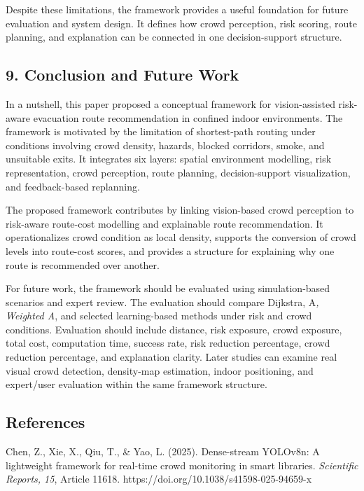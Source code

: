 \documentclass[
]{article}
\begin{document}
Despite these limitations, the framework provides a useful foundation
for future evaluation and system design. It defines how crowd
perception, risk scoring, route planning, and explanation can be
connected in one decision-support structure.

\subsection{9. Conclusion and Future
Work}\label{conclusion-and-future-work}

In a nutshell, this paper proposed a conceptual framework for
vision-assisted risk-aware evacuation route recommendation in confined
indoor environments. The framework is motivated by the limitation of
shortest-path routing under conditions involving crowd density, hazards,
blocked corridors, smoke, and unsuitable exits. It integrates six
layers: spatial environment modelling, risk representation, crowd
perception, route planning, decision-support visualization, and
feedback-based replanning.

The proposed framework contributes by linking vision-based crowd
perception to risk-aware route-cost modelling and explainable route
recommendation. It operationalizes crowd condition as local density,
supports the conversion of crowd levels into route-cost scores, and
provides a structure for explaining why one route is recommended over
another.

For future work, the framework should be evaluated using
simulation-based scenarios and expert review. The evaluation should
compare Dijkstra, A\emph{, Weighted A}, and selected learning-based
methods under risk and crowd conditions. Evaluation should include
distance, risk exposure, crowd exposure, total cost, computation time,
success rate, risk reduction percentage, crowd reduction percentage, and
explanation clarity. Later studies can examine real visual crowd
detection, density-map estimation, indoor positioning, and expert/user
evaluation within the same framework structure.

\subsection{References}\label{references}

Chen, Z., Xie, X., Qiu, T., \& Yao, L. (2025). Dense-stream YOLOv8n: A
lightweight framework for real-time crowd monitoring in smart libraries.
\emph{Scientific Reports, 15}, Article 11618.
https://doi.org/10.1038/s41598-025-94659-x
\end{document}
